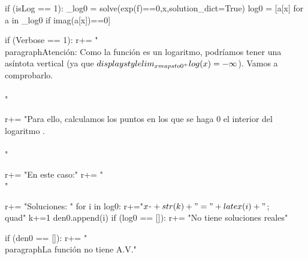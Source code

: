 \begin{sagesilent}
    if (isLog == 1):
        _log0 = solve(exp(f)==0,x,solution_dict=True)
        log0 = [a[x] for a in _log0 if imag(a[x])==0]  

        if (Verbose == 1):
            r+= "\\paragraph{Atención: } Como la función es un logaritmo, podríamos tener una asíntota vertical (ya que $\\displaystyle\\lim_{x\\mapsto 0^+} \\log(x) = -\infty$). Vamos a comprobarlo.\\\\"

            r+= "Para ello, calculamos los puntos en los que se haga 0 el interior del logaritmo .\\\\"

        
            r+= "En este caso:"
        r+= "\\[ "+latex(exp(f))+"= 0 \\]"

        r+= "Soluciones: "
        for i in log0:
            r+="$x_"+str(k)+"="+latex(i)+" $;\\quad"
            k+=1
            den0.append(i)
        if (log0 == []):
            r+= "No tiene soluciones reales"

    if (den0 == []):
        r+= "\\paragraph{La función no tiene A.V.}"


\end{sagesilent}
